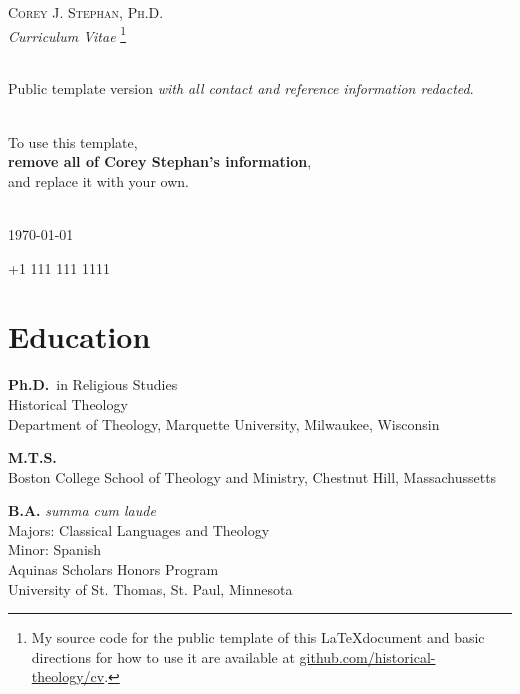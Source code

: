 \documentclass[letterpaper,12pt]{article}
\newcommand{\years}[1]{%
  {\reversemarginpar\strut\marginnote{{\small#1}}}%
}
\begin{document}
{
\begin{center}
  \Huge \textsc{Corey J. Stephan, Ph.D.} \\
  
  \normalsize \emph{Curriculum Vitae}
  \footnote{My source code for the public template of this \LaTeX\space document and basic directions for how to use it are available at \href{https:www.github.com/historical-theology/cv}{github.com/historical-theology/cv}.} \\
  \
  
	Public template version \emph{with all contact and reference information redacted}.\\
\

	To use this template, \\ \textbf{remove all of Corey Stephan's information}, \\ and replace it with your own.\\
	\
	
  \today
\end{center}
  \begin{center}
    \normalsize
      \faPhone\space+1 111 111 1111 \space 															
      \enspace\faEnvelope{} \space
      \enspace\faHome{}	
  \end{center}
}



\section*{Education}

\years{2022}%
%
\textbf{Ph.D.}\ in Religious Studies \\
Historical Theology \\
Department of Theology, Marquette University, Milwaukee, Wisconsin \\ [.3cm]
\years{2017}%
%
\textbf{M.T.S.}\ \\
Boston College School of Theology and Ministry, Chestnut Hill, Massachussetts \\ [.3cm]
\years{2015}%
%
\textbf{B.A.} \emph{summa cum laude} \\
Majors: Classical Languages and Theology \\ 
Minor: Spanish \\
Aquinas Scholars Honors Program \\
University of St. Thomas, St. Paul, Minnesota
\end{document}
